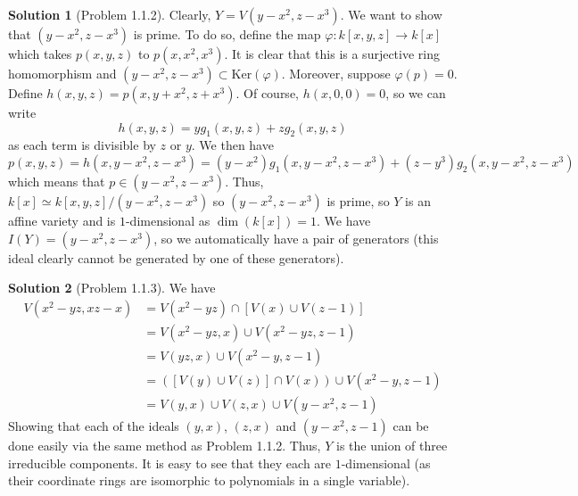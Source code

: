 \documentclass[aps,pra,showpacs,notitlepage,onecolumn,superscriptaddress,nofootinbib]{revtex4-1}
\theoremstyle{definition}
\newtheorem{solution}{Solution}[section]
\begin{document}
\begin{solution}[Problem 1.1.2]
  Clearly, $Y = V(y - x^2, z - x^3)$. We want to show that $(y - x^2, z - x^3)$ is prime. To do so, define the map $\varphi : k[x, y, z] \rightarrow k[x]$ which takes $p(x, y, z)$ to $p(x, x^2, x^3)$. It is
  clear that this is a surjective ring homomorphism and $(y - x^2, z - x^3) \subset \text{Ker}(\varphi)$. Moreover, suppose $\varphi(p) = 0$. Define $h(x, y, z) = p(x, y + x^2, z + x^3)$. Of course,
  $h(x, 0, 0) = 0$, so we can write
  \begin{equation}
    h(x, y, z) = y g_1(x, y, z) + z g_2(x, y, z)
    \end{equation}
  as each term is divisible by $z$ or $y$. We then have
  \begin{equation}
    p(x, y, z) = h(x, y - x^2, z - x^3) = (y - x^2) g_1(x, y - x^2, z - x^3) + (z - y^3) g_2(x, y - x^2, z - x^3)
    \end{equation}
  which means that $p \in (y - x^2, z - x^3)$. Thus, $k[x] \simeq k[x, y, z]/(y - x^2, z - x^3)$ so $(y - x^2, z - x^3)$ is prime, so $Y$ is an affine variety and is $1$-dimensional as $\dim(k[x]) = 1$.
  We have $I(Y) = (y - x^2, z - x^3)$, so we automatically have a pair of generators (this ideal clearly cannot be generated by one of these generators).
  \end{solution}

\begin{solution}[Problem 1.1.3]
  We have
  \begin{align}
    V(x^2 - yz, xz - x) &= V(x^2 - yz) \cap [V(x) \cup V(z - 1)]
    \\ &= V(x^2 - yz, x) \cup V(x^2 - yz, z - 1)
    \\ &= V(yz, x) \cup V(x^2 - y, z - 1)
    \\ &= ([V(y) \cup V(z)] \cap V(x)) \cup V(x^2 - y, z - 1)
    \\ &= V(y, x) \cup V(z, x) \cup V(y - x^2, z - 1)
    \end{align}
  Showing that each of the ideals $(y, x)$, $(z, x)$ and $(y - x^2, z - 1)$ can be done easily via the same method as Problem 1.1.2. Thus, $Y$ is the union of three irreducible components.
  It is easy to see that they each are $1$-dimensional (as their coordinate rings are isomorphic to polynomials in a single variable).
  \end{solution}
\end{document}
